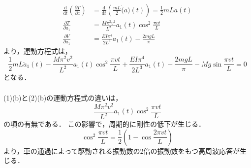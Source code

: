 \documentclass[a4paper]{jsarticle}
\begin{document}
\subsubsection{}
\begin{align}
  \frac{\mathrm{d}}{\mathrm{d} t}
  \left(\frac{\partial T}{\partial \dot{a}}\right)
   & = \frac{\mathrm{d}}{\mathrm{d} t}
  \left(\frac{m L}{2} \dot(a)(t)\right)
  = \frac{1}{2} m L \ddot{a}(t)        \\
  \frac{\partial T}{\partial a_1}
   & = \frac{M \pi^2 v^2}{L^2} a_1(t)
  \cos^2 \frac{\pi v t}{L}             \\
  \frac{\partial V}{\partial a_1}
   & = \frac{E I \pi^4}{2 L^3} a_1(t)
  - \frac{2 m g L}{\pi}
\end{align}
より，運動方程式は，
\begin{equation}
  \frac{1}{2} m L \ddot{a}_1 (t)
  - \frac{M \pi^2 v^2}{L^2} a_1(t) \cos^2 \frac{\pi v t}{L}
  + \frac{E I \pi^4}{2 L^3} a_1(t)
  - \frac{2 m g L}{\pi}
  - M g \sin \frac{\pi v t}{L} = 0
\end{equation}
となる．

\subsubsection{}
(1)(b)と(2)(b)の運動方程式の違いは，
\begin{equation}
  \frac{M \pi^2 v^2}{L^2} a_1(t) \cos^2 \frac{\pi v t}{L}
\end{equation}
の項の有無である．
この影響で，周期的に剛性の低下が生じる．
\begin{equation}
  \cos^2 \frac{\pi v t}{L} =
  \frac{1}{2} \left(1 - \cos \frac{2 \pi v t}{L}\right)
\end{equation}
より，車の通過によって駆動される振動数の2倍の振動数をもつ高周波応答が生じる．
\end{document}

